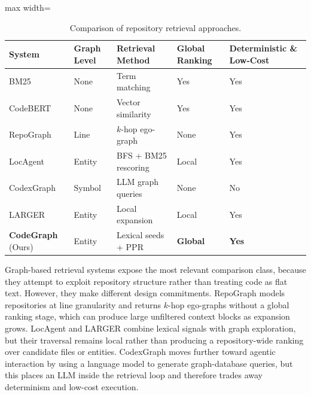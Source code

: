 \begin{table}[htbp]
    \centering
    \caption{Comparison of repository retrieval approaches.}
    \label{tab:retrieval-comparison}
    \begin{adjustbox}{max width=\linewidth}
    \begin{tabular}{lllll}
        \toprule
        \textbf{System} & \textbf{Graph Level} & \textbf{Retrieval Method} & \textbf{Global Ranking} & \textbf{Deterministic \& Low-Cost} \\
        \midrule
        BM25 \cite{bm25} & None & Term matching & Yes & Yes \\
        CodeBERT \cite{codebert} & None & Vector similarity & Yes & Yes \\
        \midrule
        RepoGraph \cite{ouyang2025repograph} & Line & $k$-hop ego-graph & None & Yes \\
        LocAgent \cite{chen2025locagent} & Entity & BFS + BM25 rescoring & Local & Yes \\
        CodexGraph \cite{liu2024codexgraph} & Symbol & LLM graph queries & None & No \\
        LARGER \cite{hu2026larger} & Entity & Local expansion & Local & Yes \\
        \midrule
        \textbf{CodeGraph} (Ours) & Entity & Lexical seeds + PPR & \textbf{Global} & \textbf{Yes} \\
        \bottomrule
    \end{tabular}
    \end{adjustbox}
\end{table}

Graph-based retrieval systems expose the most relevant comparison class, because they attempt to exploit repository structure rather than treating code as flat text. However, they make different design commitments. RepoGraph \cite{ouyang2025repograph} models repositories at line granularity and returns $k$-hop ego-graphs without a global ranking stage, which can produce large unfiltered context blocks as expansion grows. LocAgent \cite{chen2025locagent} and LARGER \cite{hu2026larger} combine lexical signals with graph exploration, but their traversal remains local rather than producing a repository-wide ranking over candidate files or entities. CodexGraph \cite{liu2024codexgraph} moves further toward agentic interaction by using a language model to generate graph-database queries, but this places an LLM inside the retrieval loop and therefore trades away determinism and low-cost execution.


